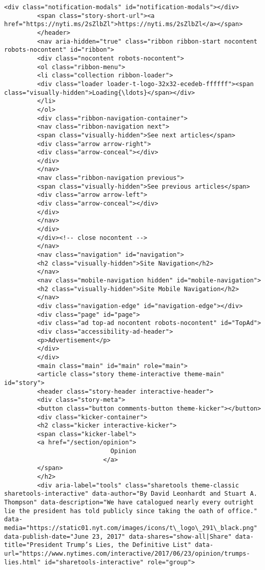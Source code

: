 \documentclass[11pt]{article}
\begin{document}
\begin{Verbatim}[commandchars=\\\{\}]
         <div class="notification-modals" id="notification-modals"></div>
         <span class="story-short-url"><a href="https://nyti.ms/2sZlbZl">https://nyti.ms/2sZlbZl</a></span>
         </header>
         <nav aria-hidden="true" class="ribbon ribbon-start nocontent robots-nocontent" id="ribbon">
         <div class="nocontent robots-nocontent">
         <ol class="ribbon-menu">
         <li class="collection ribbon-loader">
         <div class="loader loader-t-logo-32x32-ecedeb-ffffff"><span class="visually-hidden">Loading{\ldots}</span></div>
         </li>
         </ol>
         <div class="ribbon-navigation-container">
         <nav class="ribbon-navigation next">
         <span class="visually-hidden">See next articles</span>
         <div class="arrow arrow-right">
         <div class="arrow-conceal"></div>
         </div>
         </nav>
         <nav class="ribbon-navigation previous">
         <span class="visually-hidden">See previous articles</span>
         <div class="arrow arrow-left">
         <div class="arrow-conceal"></div>
         </div>
         </nav>
         </div>
         </div><!-- close nocontent -->
         </nav>
         <nav class="navigation" id="navigation">
         <h2 class="visually-hidden">Site Navigation</h2>
         </nav>
         <nav class="mobile-navigation hidden" id="mobile-navigation">
         <h2 class="visually-hidden">Site Mobile Navigation</h2>
         </nav>
         <div class="navigation-edge" id="navigation-edge"></div>
         <div class="page" id="page">
         <div class="ad top-ad nocontent robots-nocontent" id="TopAd">
         <div class="accessibility-ad-header">
         <p>Advertisement</p>
         </div>
         </div>
         <main class="main" id="main" role="main">
         <article class="story theme-interactive theme-main" id="story">
         <header class="story-header interactive-header">
         <div class="story-meta">
         <button class="button comments-button theme-kicker"></button>
         <div class="kicker-container">
         <h2 class="kicker interactive-kicker">
         <span class="kicker-label">
         <a href="/section/opinion">
                             Opinion
                           </a>
         </span>
         </h2>
         <div aria-label="tools" class="sharetools theme-classic sharetools-interactive" data-author="By David Leonhardt and Stuart A. Thompson" data-description="We have catalogued nearly every outright lie the president has told publicly since taking the oath of office." data-media="https://static01.nyt.com/images/icons/t\_logo\_291\_black.png" data-publish-date="June 23, 2017" data-shares="show-all|Share" data-title="President Trump’s Lies, the Definitive List" data-url="https://www.nytimes.com/interactive/2017/06/23/opinion/trumps-lies.html" id="sharetools-interactive" role="group">

\end{Verbatim}
\end{document}
